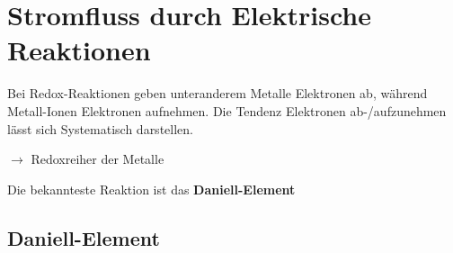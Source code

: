 \section{Stromfluss durch Elektrische Reaktionen}
Bei Redox-Reaktionen geben unteranderem Metalle Elektronen ab, während Metall-Ionen Elektronen aufnehmen.
Die Tendenz Elektronen ab-/aufzunehmen lässt sich Systematisch darstellen.

$\rightarrow$ Redoxreiher der Metalle

Die bekannteste Reaktion ist das \textbf{Daniell-Element}

\subsection{Daniell-Element}


